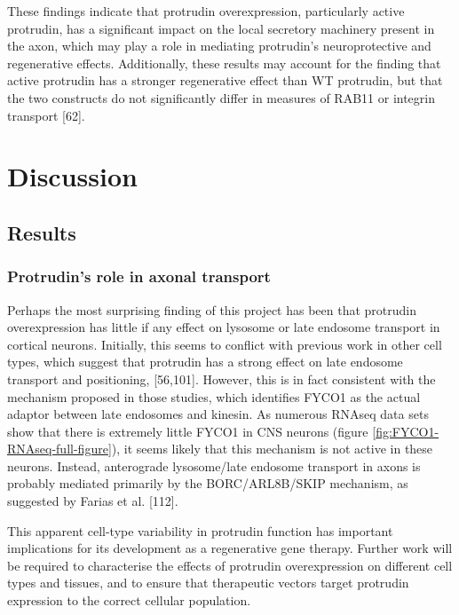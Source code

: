\documentclass[
  12pt,
  a4paper,
]{book}
\begin{document}
These findings indicate that protrudin overexpression, particularly active protrudin, has a significant impact on the local secretory machinery present in the axon, which may play a role in mediating protrudin's neuroprotective and regenerative effects. Additionally, these results may account for the finding that active protrudin has a stronger regenerative effect than WT protrudin, but that the two constructs do not significantly differ in measures of RAB11 or integrin transport {[}62{]}.

\hypertarget{DISCUSSION}{%
\chapter*{Discussion}\label{DISCUSSION}}

\setcounter{chapter}{4}
\setcounter{section}{0}
\setcounter{figure}{0}

\hypertarget{results-3}{%
\section{Results}\label{results-3}}

\hypertarget{protrudins-role-in-axonal-transport}{%
\subsection{Protrudin's role in axonal transport}\label{protrudins-role-in-axonal-transport}}

Perhaps the most surprising finding of this project has been that protrudin overexpression has little if any effect on lysosome or late endosome transport in cortical neurons. Initially, this seems to conflict with previous work in other cell types, which suggest that protrudin has a strong effect on late endosome transport and positioning, {[}56,101{]}. However, this is in fact consistent with the mechanism proposed in those studies, which identifies FYCO1 as the actual adaptor between late endosomes and kinesin. As numerous RNAseq data sets show that there is extremely little FYCO1 in CNS neurons (figure \ref{fig:FYCO1-RNAseq-full-figure}), it seems likely that this mechanism is not active in these neurons. Instead, anterograde lysosome/late endosome transport in axons is probably mediated primarily by the BORC/ARL8B/SKIP mechanism, as suggested by Farias et al. {[}112{]}.

This apparent cell-type variability in protrudin function has important implications for its development as a regenerative gene therapy. Further work will be required to characterise the effects of protrudin overexpression on different cell types and tissues, and to ensure that therapeutic vectors target protrudin expression to the correct cellular population.
\end{document}
